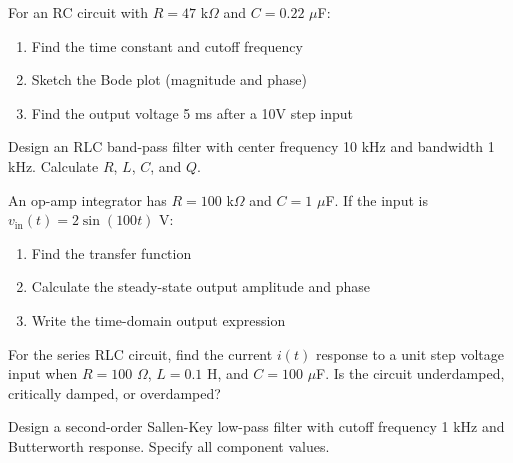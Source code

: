 
\begin{exercise}
For an RC circuit with $R = 47$ k$\Omega$ and $C = 0.22$ $\mu$F:
\begin{enumerate}[label=(\alph*)]
    \item Find the time constant and cutoff frequency
    \item Sketch the Bode plot (magnitude and phase)
    \item Find the output voltage 5 ms after a 10V step input
\end{enumerate}
\end{exercise}

\begin{exercise}
Design an RLC band-pass filter with center frequency 10 kHz and bandwidth 1 kHz. Calculate $R$, $L$, $C$, and $Q$.
\end{exercise}

\begin{exercise}
An op-amp integrator has $R = 100$ k$\Omega$ and $C = 1$ $\mu$F. If the input is $v_{\text{in}}(t) = 2\sin(100t)$ V:
\begin{enumerate}[label=(\alph*)]
    \item Find the transfer function
    \item Calculate the steady-state output amplitude and phase
    \item Write the time-domain output expression
\end{enumerate}
\end{exercise}

\begin{exercise}
For the series RLC circuit, find the current $i(t)$ response to a unit step voltage input when $R = 100$ $\Omega$, $L = 0.1$ H, and $C = 100$ $\mu$F. Is the circuit underdamped, critically damped, or overdamped?
\end{exercise}

\begin{exercise}
Design a second-order Sallen-Key low-pass filter with cutoff frequency 1 kHz and Butterworth response. Specify all component values.
\end{exercise}

